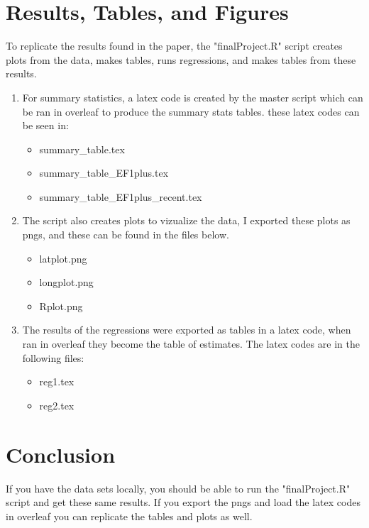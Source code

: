 \documentclass{article}
\begin{document}
\section{Results, Tables, and Figures}
To replicate the results found in the paper, the "finalProject.R" script creates plots from the data, makes tables, runs regressions, and makes tables from these results. 
\begin{enumerate}
    \item For summary statistics, a latex code is created by the master script which can be ran in overleaf to produce the summary stats tables. these latex codes can be seen in:
    \begin{itemize}
        \item summary\_table.tex
        \item summary\_table\_EF1plus.tex
        \item summary\_table\_EF1plus\_recent.tex 
        \end{itemize}
    \item The script also creates plots to vizualize the data, I exported these plots as pngs, and these can be found in the files below.
    \begin{itemize}
        \item latplot.png
        \item longplot.png
        \item Rplot.png
    \end{itemize}
    \item The results of the regressions were exported as tables in a latex code, when ran in overleaf they become the table of estimates. The latex codes are in the following files:
    \begin{itemize}
        \item reg1.tex
        \item reg2.tex
    \end{itemize}
\end{enumerate}

\section{Conclusion}
If you have the data sets locally, you should be able to run the "finalProject.R" script and get these same results. If you export the pngs and load the latex codes in overleaf you can replicate the tables and plots as well.
\end{document}
